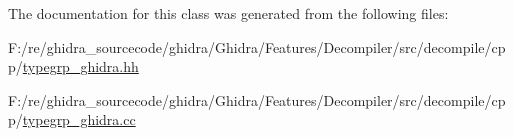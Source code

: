 The documentation for this class was generated from the following files\+:\begin{DoxyCompactItemize}
\item 
F\+:/re/ghidra\+\_\+sourcecode/ghidra/\+Ghidra/\+Features/\+Decompiler/src/decompile/cpp/\mbox{\hyperlink{typegrp__ghidra_8hh}{typegrp\+\_\+ghidra.\+hh}}\item 
F\+:/re/ghidra\+\_\+sourcecode/ghidra/\+Ghidra/\+Features/\+Decompiler/src/decompile/cpp/\mbox{\hyperlink{typegrp__ghidra_8cc}{typegrp\+\_\+ghidra.\+cc}}\end{DoxyCompactItemize}

